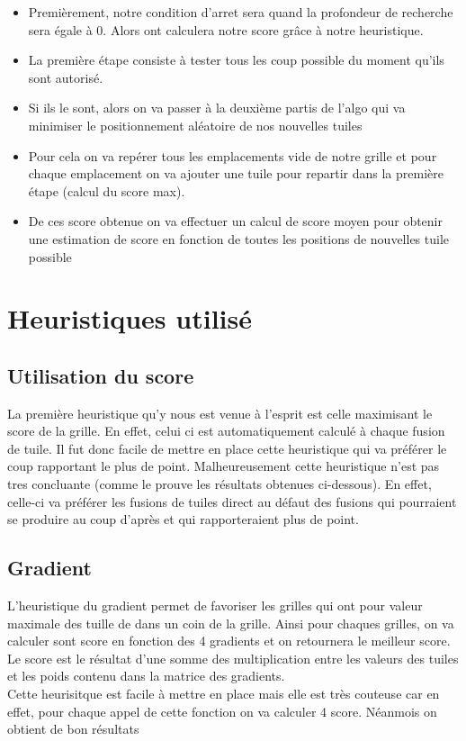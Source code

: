 \documentclass[11pt,a4paper]{article}
\begin{document}
\begin{itemize}
\item Premièrement, notre condition d'arret sera quand la profondeur de recherche sera égale à 0. Alors ont calculera notre score grâce à notre heuristique.
\item La première étape consiste à tester tous les coup possible du moment qu'ils sont autorisé.
\item Si ils le sont, alors on va passer à la deuxième partis de l'algo qui va minimiser le positionnement aléatoire de nos nouvelles tuiles
\item Pour cela on va repérer tous les emplacements vide de notre grille et pour chaque emplacement on va ajouter une tuile pour repartir dans la première étape (calcul du score max).
\item De ces score obtenue on va effectuer un calcul de score moyen pour obtenir une estimation de score en fonction de toutes les positions de nouvelles tuile possible
\end{itemize}


\section{Heuristiques utilisé}

\subsection{Utilisation du score}
La première heuristique qu'y nous est venue à l'esprit est celle maximisant le score de la grille. En effet, celui ci est automatiquement calculé à chaque fusion de tuile. Il fut donc facile de mettre en place cette heuristique qui va préférer le coup rapportant le plus de point. Malheureusement cette heuristique n'est pas tres concluante (comme le prouve les résultats obtenues ci-dessous). En effet, celle-ci va préférer les fusions de tuiles direct au défaut des fusions qui pourraient se produire au coup d'après et qui rapporteraient plus de point.

\subsection{Gradient}
L'heuristique du gradient permet de favoriser les grilles qui ont pour valeur maximale des tuille de dans un coin de la grille. Ainsi pour chaques grilles, on va calculer sont score en fonction des 4 gradients et on retournera le meilleur score. Le score est le résultat d'une somme des multiplication entre les valeurs des tuiles et les poids contenu dans la matrice des gradients.\\
Cette heurisitque est facile à mettre en place mais elle est très couteuse car en effet, pour chaque appel de cette fonction on va calculer 4 score. Néanmois on obtient de bon résultats
\end{document}

